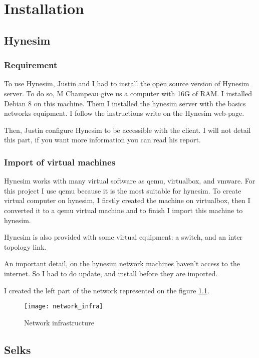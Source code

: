 
\chapter{Installation}

\section{Hynesim}

\subsection{Requirement}

To use Hynesim, Justin and I had to install the open source version of Hynesim server. To do so, M Champeau give us
a computer with 16G of RAM. I installed Debian 8 on this machine. Them I installed the hynesim server with the
basics networks equipment. I follow the instructions write on the Hynesim web-page.

Then, Justin configure Hynesim to be accessible with the client. I will not detail this part, if you want more
information you can read his report.


\subsection{Import of virtual machines}

Hynesim works with many virtual software as qemu, virtualbox, and vmware. For this project I use qemu because it is
the most suitable for hynesim. To create virtual computer on hynesim, I firstly created the machine on virtualbox,
then I converted it to a qemu virtual machine and to finish I import this machine to hynesim.

Hynesim is also provided with some virtual equipment: a switch, and an inter topology link.

An important detail, on the hynesim network machines haven't access to the internet. So I had to do update, and
install before they are imported.

I created the left part of the network represented on the figure \ref{fig:network}.


\begin{figure}[h]
  \centering
  \texttt{[image: network\_infra]}
  \caption{Network infrastructure}
  \label{fig:network}
\end{figure}

\section{Selks}

